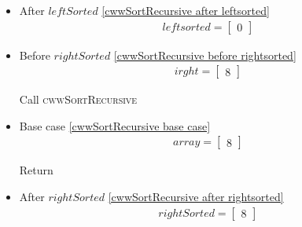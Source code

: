 \begin{frame}[containsverbatim]{\cwwalgortihmexampleframe}
\begin{columns}[c]
\begin{column}{0.65\textwidth}
{\begin{minipage}[c]{\textwidth}
\begin{multicols}{3}
\begin{itemize}
                                    Return
        
                                    \item After $leftSorted$ \cref{cwwSortRecursive after leftsorted}
                                    \begin{align*}
                                        leftsorted = \begin{bmatrix}0\end{bmatrix}
                                    \end{align*}
        
                                    \item Before $rightSorted$ \cref{cwwSortRecursive before rightsorted}
                                    \begin{align*}
                                        irght = \begin{bmatrix}8\end{bmatrix}
                                    \end{align*}
        
                                    Call \textsc{cwwSortRecursive}
        
                                    \item Base case \cref{cwwSortRecursive base case}
                                    \begin{align*}
                                        array = \begin{bmatrix}8\end{bmatrix}
                                    \end{align*}
        
                                    Return
        
                                    \item After $rightSorted$ \cref{cwwSortRecursive after rightsorted}
                                    \begin{align*}
                                        rightSorted = \begin{bmatrix}8\end{bmatrix}
                                    \end{align*}
        

\end{itemize}
\end{multicols}
\end{minipage}}
\end{column}
\end{columns}
\end{frame}
